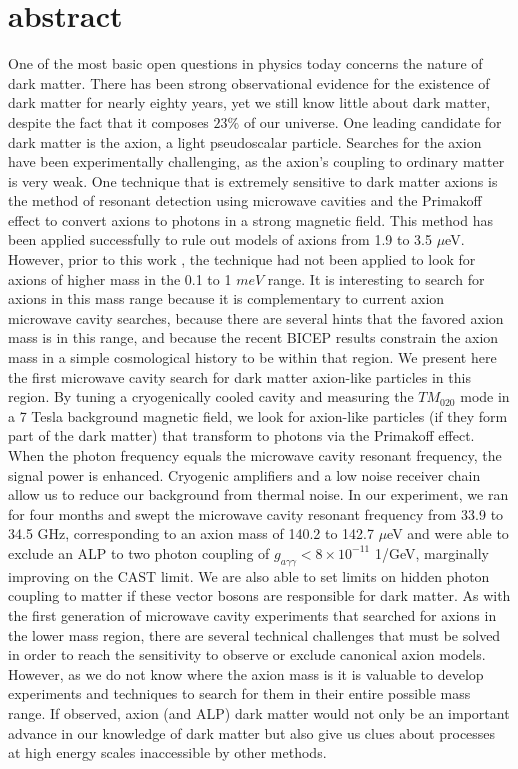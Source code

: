 \documentclass[12pt,twosides]{book}
\begin{document}
\section{abstract}

One of the most basic open questions in physics today concerns the nature of dark matter. There has been strong observational evidence for the existence of dark matter for nearly eighty years, yet we still know little about dark matter, despite the fact that it composes $23\%$ of our universe. One leading candidate for dark matter is the axion, a light pseudoscalar particle. Searches for the axion have been experimentally challenging, as the axion's coupling to ordinary matter is very weak. One technique that is extremely sensitive to dark matter axions is the method of resonant detection using microwave cavities and the Primakoff effect to convert axions to photons in a strong magnetic field. This method has been applied successfully to rule out models of axions from 1.9 to 3.5 $\mu$eV. However, prior to this work , the technique had not been applied to look for axions of higher mass in the 0.1 to 1 $meV$ range. It is interesting to search for axions in this mass range because it is complementary to current axion microwave cavity searches, because there are several hints that the favored axion mass is in this range, and because the recent BICEP results constrain the axion mass in a simple cosmological history to be within that region. We present here the first microwave cavity search for dark matter axion-like particles in this region. By tuning a cryogenically cooled cavity and measuring the $TM_{020}$ mode in a 7 Tesla background magnetic field, we look for axion-like particles (if they form part of the dark matter) that transform to photons via the Primakoff effect. When the photon frequency equals the microwave cavity resonant frequency, the signal power is enhanced. Cryogenic amplifiers and a low noise receiver chain allow us to reduce our background from thermal noise. In our experiment, we ran for four months and swept the microwave cavity resonant frequency from 33.9 to 34.5 GHz, corresponding to an axion mass of 140.2  to 142.7 $\mu$eV and were able to exclude an ALP to two photon coupling of $g_{a\gamma\gamma} < 8\times10^{-11}$ 1/GeV, marginally improving on the CAST limit. We are also able to set limits on hidden photon coupling to matter if these vector bosons are responsible for dark matter. As with the first generation of microwave cavity experiments that searched for axions in the lower mass region, there are several technical challenges that must be solved in order to reach the sensitivity to observe or exclude canonical axion models. However, as we do not know where the axion mass is it is valuable to develop experiments and techniques to search for them in their entire possible mass range. If observed, axion (and ALP) dark matter would not only be an important advance in our knowledge of dark matter but also give us clues about processes at high energy scales inaccessible by other methods.
\end{document}
